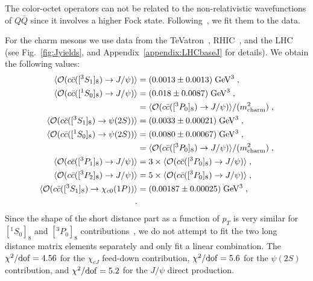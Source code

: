 \documentclass[article,showpacs,preprintnumbers,amsmath,amssymb]{revtex4}
\newcommand{\barQ}{{\bar{Q}}}
\newcommand{\barc}{{\bar{c}}}
\newcommand{\calO}{{\cal{O}}}
\newcommand{\charm}{{\rm{charm}}}
\begin{document}
The color-octet operators can not be related to the non-relativistic
wavefunctions of $Q\barQ$ since it involves a higher Fock state.
Following~\cite{Cho:1995ce,Cho:1995vh,Braaten:2000cm}, we fit them to the data.

For the charm mesons we use data from the
TeVatron~\cite{Abe:1997older,Abe:1997yz,Acosta:2004yw,Aaltonen:2009dm},
RHIC~\cite{Adare:2009js,Abelev:2009qaa}, and the
LHC~\cite{Chatrchyan:2011kc,Aad:2011sp} (see Fig.~\ref{fig:Jyields}, and
Appendix~\ref{appendix:LHCbaseJ} for details).  We obtain the following values:
\begin{equation}
\begin{split}
\langle \calO(c\barc([^3S_1]_{8})\rightarrow J/\psi)\rangle
&=(0.0013\pm0.0013)\;{\rm GeV^3} \;, \\
\langle \calO(c\barc([^1S_0]_{8})\rightarrow J/\psi)\rangle 
&=(0.018\pm0.0087)\;{\rm GeV^3}\;, \\
&=\langle \calO(c\barc([^3P_0]_{8})\rightarrow J/\psi)\rangle/(m_{\charm}^2) 
\;, \\
\langle \calO(c\barc([^3S_1]_{8})\rightarrow \psi(2S))\rangle
&=(0.0033\pm0.00021)\;{\rm GeV^3} \;, \\
\langle \calO(c\barc([^1S_0]_{8})\rightarrow \psi(2S))\rangle 
&=(0.0080\pm0.00067)\;{\rm GeV^3}\;, \\
&=\langle \calO(c\barc([^3P_0]_{8})\rightarrow J/\psi)\rangle/(m_{\charm}^2) 
\;, \\
\langle \calO(c\barc([^3P_1]_{8})\rightarrow J/\psi)\rangle 
&=3\times\langle \calO(c\barc([^3P_0]_{8})\rightarrow J/\psi)\rangle \;, \\
\langle \calO(c\barc([^3P_2]_{8})\rightarrow J/\psi)\rangle 
&=5\times\langle \calO(c\barc([^3P_0]_{8})\rightarrow J/\psi)\rangle\;, \\
\langle \calO(c\barc([^3S_1]_{8})\rightarrow \chi_{c0}(1P))\rangle 
&=(0.00187\pm0.00025)\;{\rm GeV^3}\;, \\
\label{eq:charmoctet} \;.
\end{split}
\end{equation}
Since the shape of the short distance part as a function of $p_T$ is very
similar for $[^1S_0]_8$ and $[^3P_0]_8$
contributions~\cite{Cho:1995ce,Cho:1995vh}, we do not attempt to fit the two
long distance matrix elements separately and only fit a linear combination. The
$\chi^2/{\rm{dof}}=4.56$ for the $\chi_{cJ}$ feed-down contribution,
$\chi^2/{\rm{dof}}=5.6$ for the $\psi(2S)$ contribution, and
$\chi^2/{\rm{dof}}=5.2$ for the $J/\psi$ direct production.
\end{document}
